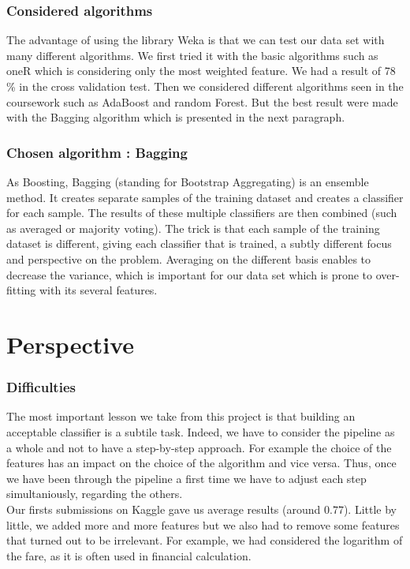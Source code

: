 \documentclass[11pt,a4paper,portrait]{article}
\begin{document}
\section{Considered algorithms}
The advantage of using the library Weka is that we can test our data set with many different algorithms. We first tried it with the basic algorithms such as oneR which is considering only the most weighted feature. We had a result of 78 \% in the cross validation test. Then we considered different algorithms seen in the coursework such as AdaBoost and random Forest. But the best result were made with the Bagging algorithm which is presented in the next paragraph.

\section{Chosen algorithm : Bagging}
As Boosting, Bagging (standing for Bootstrap Aggregating) is an ensemble method. It creates separate samples of the training dataset and creates a classifier for each sample. The results of these multiple classifiers are then combined (such as averaged or majority voting). The trick is that each sample of the training dataset is different, giving each classifier that is trained, a subtly different focus and perspective on the problem. Averaging on the different basis enables to decrease the variance, which is important for our data set which is prone to over-fitting with its several features.


\part{Perspective}
\setcounter{section}{0}

\section{Difficulties}
The most important lesson we take from this project is that building an acceptable classifier is a subtile task. Indeed, we have to consider the pipeline as a whole and not to have a step-by-step approach. For example the choice of the features has an impact on the choice of the algorithm and vice versa. Thus, once we have been through the pipeline a first time we have to adjust each step simultaniously, regarding the others.\\
Our firsts submissions on Kaggle gave us average results (around $0.77$). Little by little, we added more and more features but we also had to remove some features that turned out to be irrelevant. For example, we had considered the logarithm of the fare, as it is often used in financial calculation.
\end{document}
